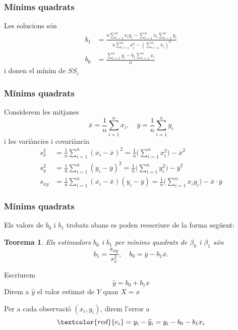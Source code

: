 \documentclass[12pt,t]{beamer}
\newcommand{\red}[1]{\textcolor{red}{#1}}
\renewcommand{\emph}[1]{{\color{red}#1}}
\theoremstyle{plain}
\newtheorem{teorema}{Teorema}
\theoremstyle{definition}
\begin{document}
\begin{frame}
\frametitle{Mínims quadrats}
Les solucions són
$$
\begin{array}{rl}
b_1& \displaystyle=\frac{n \sum\limits_{i=1}^n x_i y_i-\sum\limits_{i=1}^n x_i\sum\limits_{i=1}^n y_i} {n\sum\limits_{i=1}^n
x_i^2-(\sum\limits_{i=1}^n x_i)^2}\\[6ex]
b_0& \displaystyle=\frac{\sum\limits_{i=1}^n y_i -b_1 \sum\limits_{i=1}^n x_i}{n}
\end{array}
$$
i  donen el mínim de $SS_\varepsilon$
\end{frame}

\begin{frame}
\frametitle{Mínims quadrats}
Considerem les mitjanes
$$
\overline{x}=\frac{1}{n}\sum\limits_{i=1}^n x_i,
\quad \overline{y}=\frac{1}{n} \sum\limits_{i=1}^n y_i
$$
i les variàncies i covariància 
$$
\begin{array}{rl}
s_x^2 &\displaystyle =\frac{1}{n}\sum_{i=1}^n (x_i-\overline{x})^2 =\frac{1}{n}\Big(\sum_{i=1}^n x_i^2\Big) -\overline{x}^2\\[2ex]
s_y^2 &\displaystyle =\frac{1}{n}\sum_{i=1}^n (y_i-\overline{y})^2 =\frac{1}{n}\Big(\sum_{i=1}^n y_i^2\Big) -\overline{y}^2\\[2ex]
s_{xy} &\displaystyle =\frac{1}{n}\sum_{i=1}^n (x_i-\overline{x}) (y_i-\overline{y}) =\frac{1}{n}\Big(\sum_{i=1}^n x_i y_i\Big)-\overline{x}\cdot\overline{y}
\end{array}
$$
\end{frame}

\begin{frame}
\frametitle{Mínims quadrats}
Els valors de $b_0$ i $b_1$ trobats abans es poden reescriure de la forma següent:

\begin{teorema}
Els estimadors $b_0$ i $b_1$ per mínims quadrats de $\beta_0$ i $\beta_1$ són
$$
b_1 =\frac{s_{xy}}{s_x^2},\quad b_0 = \overline{y}-b_1 \overline{x}.
$$
\end{teorema}
Escriurem
$$
\widehat{y}=b_0+b_1x
$$
Direm a $\widehat{y}$ el \emph{valor estimat} de $Y$ quan $X=x$
\medskip

Per a cada observació $(x_i,y_i)$, direm l'\emph{error} a 
$$
\red{e_i}=y_i-\widehat{y}_i={y}_i-b_0-b_1x_i
$$
\end{frame}
\end{document}
